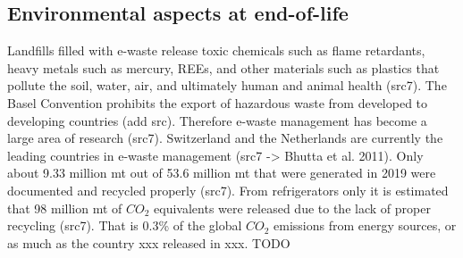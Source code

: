 \subsection{Environmental aspects at end-of-life}

Landfills filled with e-waste release toxic chemicals such as flame retardants, heavy metals such as mercury, REEs, and other materials such as plastics that pollute the soil, water, air, and ultimately human and animal health (src7). The Basel Convention prohibits the export of hazardous waste from developed to developing countries (add src). Therefore e-waste management has become a large area of research (src7). Switzerland and the Netherlands are currently the leading countries in e-waste management (src7 -> Bhutta et al. 2011).
Only about 9.33 million mt out of 53.6 million mt that were generated in 2019 were documented and recycled properly (src7). From refrigerators only it is estimated that 98 million mt of $CO_2$ equivalents were released due to the lack of proper recycling (src7). That is 0.3\% of the global $CO_2$ emissions from energy sources, or as much as the country xxx released in xxx. TODO

